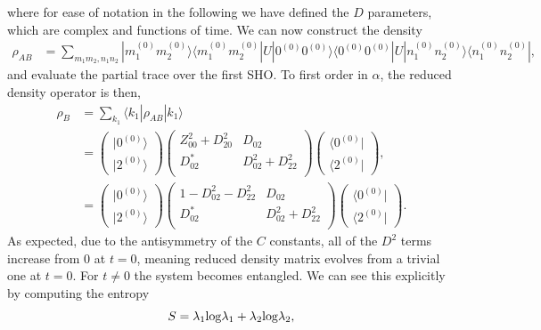 \documentclass[aps,showpacs,onecolumn,floats,prd,superscriptaddress,nofootinbib]{revtex4-1}
\begin{document}
where for ease of notation in the following we have defined the $D$ parameters, which are complex and functions of time. We can now construct the density
\begin{align}
\rho_{AB} &= \sum_{m_1m_2,n_1n_2} | m_1^{(0)} m_2^{(0)} \rangle \langle m_1^{(0)} m_2^{(0)} | U | 0^{(0)} 0^{(0)} \rangle \langle 0^{(0)} 0^{(0)} | U | n_1^{(0)} n_2^{(0)} \rangle \langle n_1^{(0)} n_2^{(0)} | \label{density1},
\end{align}
and evaluate the partial trace over the first SHO. To first order in $\alpha$, the reduced density operator is then,
\begin{align}
\rho_{B} &= \sum_{k_1} \langle k_1 | \rho_{AB} | k_1 \rangle
\nonumber \\ & = 
\left( \begin{matrix}
 |  0^{(0)} \rangle \\
 |   2^{(0)} \rangle 
 \end{matrix} \right)
\left( \begin{matrix}
 Z_{00}^2 + D_{20}^2 & D_{02} \\
D_{02}^* & D_{02}^2 + D_{22}^2  \\
 \end{matrix} \right)
 \left( \begin{matrix}
  \langle 0^{(0)} | \\
  \langle  2^{(0)} |
 \end{matrix} \right),
 \nonumber \\ & = 
\left( \begin{matrix}
 |  0^{(0)} \rangle \\
 |   2^{(0)} \rangle 
 \end{matrix} \right)
\left( \begin{matrix}
 1 - D_{02}^2 - D_{22}^2 & D_{02} \\
D_{02}^* & D_{02}^2 + D_{22}^2  \\
 \end{matrix} \right)
 \left( \begin{matrix}
  \langle 0^{(0)} | \\
  \langle  2^{(0)} |
 \end{matrix} \right). \label{reduceddensity1}
\end{align}
As expected, due to the antisymmetry of the $C$ constants, all of the $D^2$ terms increase from $0$ at $t=0$, meaning reduced density matrix evolves from a trivial one at $t=0$. For $t\neq 0$ the system becomes entangled. We can see this explicitly by computing the entropy
\begin{equation}
S = \lambda_1 {\rm log} \lambda_1 + \lambda_2 {\rm log} \lambda_2,
\end{equation}
\end{document}

